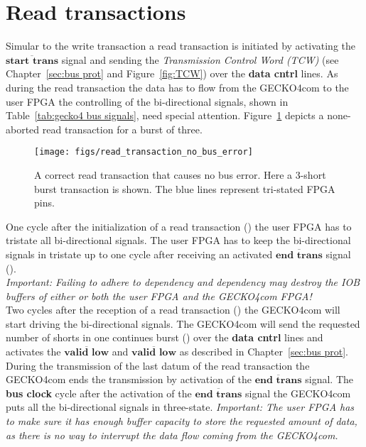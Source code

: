 \section{Read transactions}
Simular to the write transaction a read transaction is initiated  by activating the $\overline{\textbf{start
trans}}$ signal and sending the \emph{Transmission Control Word (TCW)} (see
Chapter~\ref{sec:bus prot} and Figure~\ref{fig:TCW}) over the \textbf{data
cntrl} lines. As during the read transaction the data has to flow from the {\sc
GECKO4com} to the user FPGA the controlling of the bi-directional signals, shown
in  Table~\ref{tab:gecko4 bus signals}, need special attention.
Figure~\ref{fig:read correct} depicts a none-aborted read transaction for a
burst of three. 
\begin{figure}[t]
\centering%
\texttt{[image: figs/read\_transaction\_no\_bus\_error]}
\caption{A correct read transaction that causes no bus error. Here a 3-short
burst transaction is shown. The blue lines represent tri-stated FPGA pins.}
\label{fig:read correct}
\end{figure}
One cycle after the initialization of a read transaction () the user
FPGA has to tristate all bi-directional signals. The user FPGA has to keep the
bi-directional signals in tristate up to one cycle after receiving an activated
$\overline{\textbf{end trans}}$ signal ().\\
\textit{Important: Failing to adhere to dependency  and dependency  may
destroy the IOB buffers of either or both the user FPGA and the {\sc GECKO4com}
FPGA!\important}\\
Two cycles after the reception of a read transaction () the {\sc GECKO4com} will
start driving the bi-directional signals. The {\sc GECKO4com} will send the
requested number of shorts in one continues burst () over the \textbf{data cntrl}
lines and activates the $\overline{\textbf{valid low}}$ and
$\overline{\textbf{valid low}}$ as described in Chapter~\ref{sec:bus prot}. During the transmission of the last datum of the read transaction
the {\sc GECKO4com} ends the transmission by activation of the
$\overline{\textbf{end trans}}$ signal. The \textbf{bus clock} cycle after the
activation of the $\overline{\textbf{end trans}}$ signal the {\sc GECKO4com}
puts all the bi-directional signals in three-state.\newpage
\textit{Important: The user FPGA has to make sure it has enough buffer capacity
to store the requested amount of data, as there is no way to interrupt the data
flow coming from the {\sc GECKO4com}.\important}
